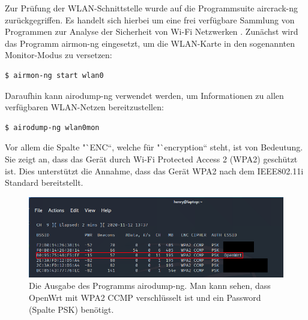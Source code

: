 \documentclass[a4paper]{book}
\begin{document}
\begin{large}
\begin{onehalfspace}
Zur Prüfung der WLAN-Schnittstelle wurde auf die Programmsuite aircrack-ng zurückgegriffen. Es handelt sich hierbei um eine frei verfügbare Sammlung von Programmen zur Analyse der Sicherheit von Wi-Fi Netzwerken \cite{ThomasdOtreppedeBouvette.25.01.2020}. Zunächst wird das Programm airmon-ng eingesetzt, um die WLAN-Karte in den sogenannten Monitor-Modus zu versetzen:\\

\begin{lstlisting}[language=sh,caption={Kommando um die WLAN-Karte in den Monitormodus zu versetzen. Der Name der verwendeten Karte ist wlan0.}]
$ airmon-ng start wlan0
\end{lstlisting}


\noindent Daraufhin kann airodump-ng verwendet werden, um Informationen zu allen verfügbaren WLAN-Netzen bereitzustellen: \\

\begin{lstlisting}[language=sh,caption={Kommando um airodump-ng mit der soeben in den Monitormodus versetzen WLAN-Karte zu starten.}]
$ airodump-ng wlan0mon
\end{lstlisting}

\vfill \pagebreak

\noindent Vor allem die Spalte "`ENC“, welche für "`encryption“ steht, ist von Bedeutung. Sie zeigt an, dass das Gerät durch Wi-Fi Protected Access 2 (WPA2) geschützt ist. Dies unterstützt die Annahme, dass das Gerät WPA2 nach dem IEEE802.11i Standard bereitstellt. 

\begin{figure}[ht]
\begin{center}
\includegraphics[scale=0.6]{images/airodump_output} 
\caption{Die Ausgabe des Programms airodump-ng. Man kann sehen, dass OpenWrt mit WPA2 CCMP verschlüsselt ist und ein Password (Spalte PSK) benötigt. }
\label{fig:Airodump-ng Ausgabe}
\end{center}
\end{figure}

\end{onehalfspace}



\end{large}
\end{document}
